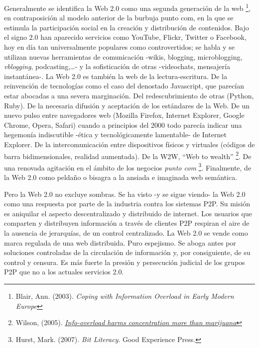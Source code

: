 \documentclass[12pt, a4paper,twoside]{book}
\begin{document}
Generalmente se identifica la Web 2.0 como una segunda generación
de la web%
\footnote{Blair, Ann. (2003).
\emph{Coping with Information Overload in Early Modern Europe}},
en contraposición al modelo anterior de la burbuja punto com, en la
que se estimula la participación social en la creación y
distribución de contenidos. Bajo el signo 2.0 han aparecido
servicios como YouTube, Flickr, Twitter o Facebook, hoy en día tan
universalmente populares como controvertidos; se habla y se
utilizan nuevas herramientas de comunicación -wikis, blogging,
microblogging, \emph{vblogging}, podcasting,\ldots{}- y la
sofisticación de otras -videochats, mensajería instantánea-. La Web
2.0 es también la web de la lectura-escritura. De la reinvención de
tecnologías como el caso del denostado Javascript, que parecían
estar abocadas a una severa marginación. Del redescubrimiento de
otras (Python, Ruby). De la necesaria difusión y aceptación de los
estándares de la Web. De un nuevo pulso entre navegadores web
(Mozilla Firefox, Internet Explorer, Google Chrome, Opera, Safari)
cuando a principios del 2000 todo parecía indicar una hegemonía
indiscutible -ética y tecnológicamente lamentable- de Internet
Explorer. De la intercomunicación entre dispositivos físicos y
virtuales (códigos de barra bidimensionales, realidad aumentada).
De la W2W, ``Web to wealth''%
\footnote{Wilson, (2005).
\emph{\href{http://www.newscientist.com/article/mg18624973.400}{Info-overload harms concentration more than marijuana}}}.
De una renovada agitación en el ámbito de los negocios
\emph{punto com}%
\footnote{Hurst, Mark. (2007). \emph{Bit Literacy}. Good Experience Press.}.
Finalmente, de la Web 2.0 como peldaño o bisagra a la ansiada e
imaginada web semántica.

Pero la Web 2.0 no excluye sombras. Se ha visto -y se sigue viendo-
la Web 2.0 como una respuesta por parte de la industria contra los
sistemas P2P. Su misión es aniquilar el aspecto descentralizado y
distribuido de internet. Los usuarios que comparten y distribuyen
información a través de clientes P2P respiran el aire de la
ausencia de jerarquías, de un control centralizado. La Web 2.0 se
vende como marca regulada de una web distribuida. Puro espejismo.
Se aboga antes por soluciones controladas de la circulación de
información y, por consiguiente, de su control y censura. Es más
fuerte la presión y persecución judicial de los grupos P2P que no a
los actuales servicios 2.0.
\end{document}
